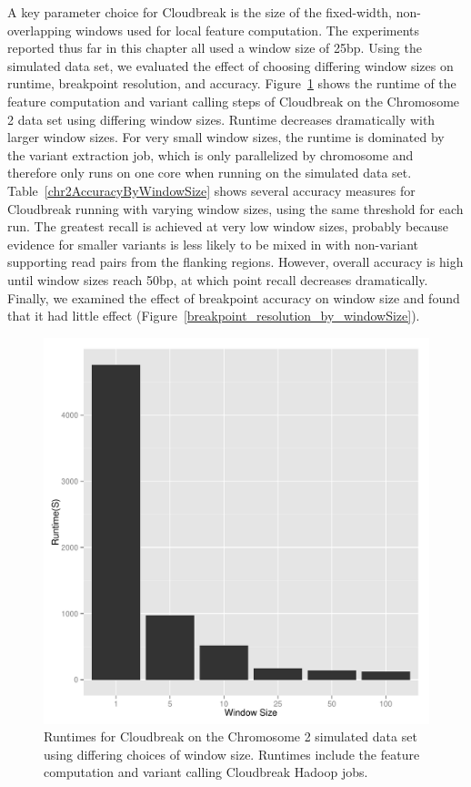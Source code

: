A key parameter choice for Cloudbreak is the size of the fixed-width, non-overlapping windows used for local feature computation. The experiments reported thus far in this chapter all used a window size of 25bp. Using the simulated data set, we evaluated the effect of choosing differing window sizes on runtime, breakpoint resolution, and accuracy. Figure~\ref{figure_runtime_by_window_size} shows the runtime of the feature computation and variant calling steps of Cloudbreak on the Chromosome 2 data set using differing window sizes. Runtime decreases dramatically with larger window sizes. For very small window sizes, the runtime is dominated by the variant extraction job, which is only parallelized by chromosome and therefore only runs on one core when running on the simulated data set. Table~\ref{chr2AccuracyByWindowSize} shows several accuracy measures for Cloudbreak running with varying window sizes, using the same threshold for each run. The greatest recall is achieved at very low window sizes, probably because evidence for smaller variants is less likely to be mixed in with non-variant supporting read pairs from the flanking regions. However, overall accuracy is high until window sizes reach 50bp, at which point recall decreases dramatically. Finally, we examined the effect of breakpoint accuracy on window size and found that it had little effect (Figure~\ref{breakpoint_resolution_by_windowSize}).

\begin{figure}
\centering
\includegraphics[width=.8\textwidth]{figures/runtime_by_windowSize.pdf}
\caption[Cloudbreak runtimes with varying window sizes.]{Runtimes for Cloudbreak on the Chromosome 2 simulated data set using differing choices of window size. Runtimes include the feature computation and variant calling Cloudbreak Hadoop jobs.}
\label{figure_runtime_by_window_size}
\end{figure}

